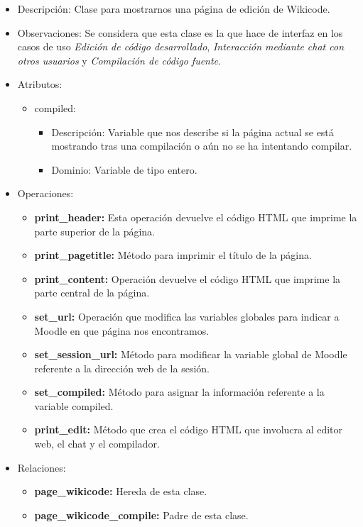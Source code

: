 \begin{itemize}
	\item Descripción: Clase para mostrarnos una página de edición de Wikicode.
	\item Observaciones: Se considera que esta clase es la que hace de interfaz en los casos de uso \emph{Edición de código desarrollado}, \emph{Interacción mediante chat con otros usuarios} y \emph{Compilación de código fuente}.
	\item Atributos:
		\begin{itemize}
			\item compiled:
				\begin{itemize}
					\item Descripción: Variable que nos describe si la página actual se está mostrando tras una compilación o aún no se ha intentando compilar.
					\item Dominio: Variable de tipo entero.
				\end{itemize}
		\end{itemize}
	\item Operaciones:
		\begin{itemize}
			\item \textbf{print\_header: }Esta operación devuelve el código HTML que imprime la parte superior de la página.
			\item \textbf{print\_pagetitle: }Método para imprimir el título de la página.
			\item \textbf{print\_content: }Operación devuelve el código HTML que imprime la parte central de la página.
			\item \textbf{set\_url: }Operación que modifica las variables globales para indicar a Moodle en que página nos encontramos.
			\item \textbf{set\_session\_url: }Método para modificar la variable global de Moodle referente a la dirección web de la sesión.
			\item \textbf{set\_compiled: }Método para asignar la información referente a la variable compiled.
			\item \textbf{print\_edit: }Método que crea el código HTML que involucra al editor web, el chat y el compilador.
		\end{itemize}
	\item Relaciones:
		\begin{itemize}
			\item \textbf{page\_wikicode:} Hereda de esta clase.
			\item \textbf{page\_wikicode\_compile:} Padre de esta clase.

\end{itemize}
\end{itemize}
